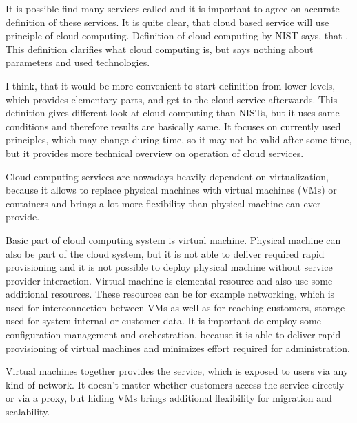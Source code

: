 
It is possible find many services called  and it is important to agree on accurate definition of these services. It is quite clear, that cloud based service will use principle of cloud computing. Definition of cloud computing by \Ac{NIST} says, that  \cite{cloud-definition}. This definition clarifies what cloud computing is, but says nothing about parameters and used technologies.

I think, that it would be more convenient to start definition from lower levels, which provides elementary parts, and get to the cloud service afterwards. This definition gives different look at cloud computing than \Ac{NIST}s, but it uses same conditions and therefore results are basically same. It focuses on currently used principles, which may change during time, so it may not be valid after some time, but it provides more technical overview on operation of cloud services.

Cloud computing services are nowadays heavily dependent on virtualization, because it allows to replace physical machines with virtual machines (\Ac{VM}s) or containers and brings a lot more flexibility than physical machine can ever provide.

Basic part of cloud computing system is virtual machine. Physical machine can also be part of the cloud system, but it is not able to deliver required rapid provisioning and it is not possible to deploy physical machine without service provider interaction. Virtual machine is elemental resource and also use some additional resources. These resources can be for example networking, which is used for interconnection between \Ac{VM}s as well as for reaching customers, storage used for system internal or customer data. It is important do employ some configuration management and orchestration, because it is able to deliver rapid provisioning of virtual machines and minimizes effort required for administration.

Virtual machines together provides the service, which is exposed to users via any kind of network. It doesn't matter whether customers access the service directly or via a proxy, but hiding \Ac{VM}s brings additional flexibility for migration and scalability. 

